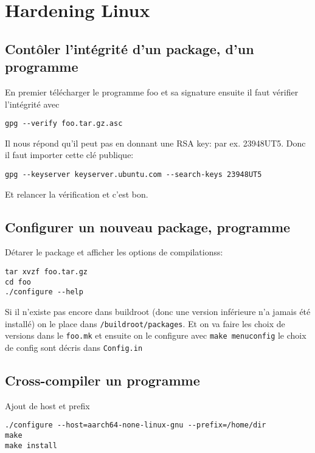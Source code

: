 \section{Hardening Linux}
\subsection{Contôler l'intégrité d'un package, d'un programme}
En premier télécharger le programme foo et sa signature ensuite il faut vérifier l'intégrité avec
\begin{lstlisting}[style=bash]
gpg --verify foo.tar.gz.asc
\end{lstlisting}
Il nous répond qu'il peut pas en donnant une RSA key: par ex. 23948UT5. Donc il faut importer cette clé publique:
\begin{lstlisting}[style=bash]
gpg --keyserver keyserver.ubuntu.com --search-keys 23948UT5
\end{lstlisting}
Et relancer la vérification et c'est bon.
\subsection{Configurer un nouveau package, programme}
Détarer le package et afficher les options de compilationss:
\begin{lstlisting}[style=bash]
tar xvzf foo.tar.gz
cd foo
./configure --help
\end{lstlisting}
Si il n'existe pas encore dans buildroot (donc une version inférieure n'a jamais été installé) on le place dans \verb!/buildroot/packages!.
Et on va faire les choix de versions dans le \verb!foo.mk! et ensuite on le configure avec \verb!make menuconfig! le choix de config sont décris dans \verb!Config.in!

\subsection{Cross-compiler un programme}
Ajout de host et prefix
\begin{lstlisting}[style=console]
./configure --host=aarch64-none-linux-gnu --prefix=/home/dir
make 
make install
\end{lstlisting}

